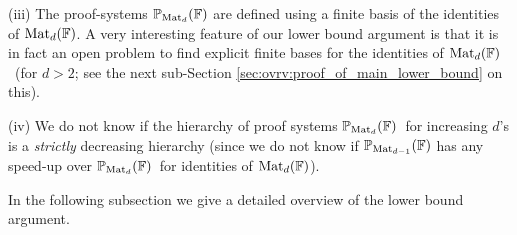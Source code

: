 \documentclass[12pt,reqno]{article}
\newtheorem*{theorem*}{Theorem}
\newcommand\F{\ensuremath{\mathbb F}}
\newcommand\PP{{\mathbb P}}
\newcommand\PMd{\ensuremath{\PP_{{\rm Mat}_d}(\F)}}
\newcommand {\ind} {\noindent}
\newcommand{\matd}{{\ensuremath{{\rm Mat}_d(\F)}}}
\newcommand{\freea}{\ensuremath{\F\langle X\rangle}}
\newcommand{\iddofix}[2][]
{\todo[inline, size=\footnotesize, caption={#2}, #1, linecolor=green!70!white,         backgroundcolor=red!30!white,bordercolor=white]
{{#2}}}
\begin{document}
(iii) The proof-systems ${\PP_{{\rm Mat}_d}(\F)}$
are defined using a finite basis of the identities of \matd. A very interesting feature of our lower bound argument is that it is in fact an open problem to find explicit finite
bases for the identities of \matd\ (for $d>2$; see the next sub-Section \ref{sec:ovrv:proof_of_main_lower_bound} on this).

(iv) We do not know if the hierarchy of proof systems \PMd\ for increasing $d$'s is a \emph{strictly} decreasing hierarchy (since we do not know if $\PP_{{\rm Mat}_{d-1}}(\F)$ has any speed-up over \PMd\  for identities of \matd).
\medskip



In the following subsection we give a detailed overview of the lower bound argument.



%
%
%

\end{document}
